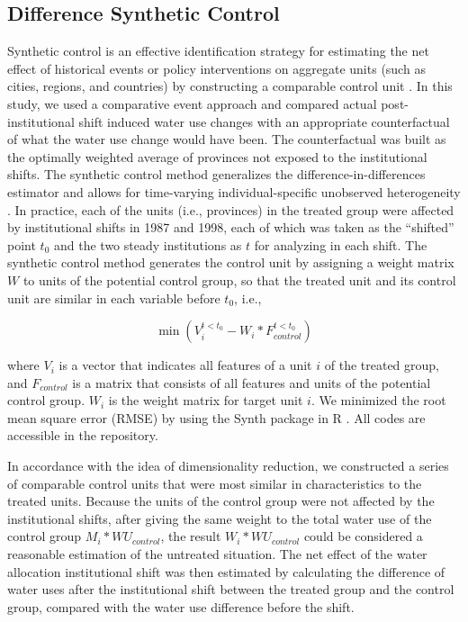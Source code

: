 \subsection{Difference Synthetic Control}
Synthetic control is an effective identification strategy for estimating the net effect of historical events or policy interventions on aggregate units (such as cities, regions, and countries) by constructing a comparable control unit \cite{abadie2010, abadie2015, hill2021}.
In this study, we used a comparative event approach and compared actual post-institutional shift induced water use changes with an appropriate counterfactual of what the water use change would have been.
The counterfactual was built as the optimally weighted average of provinces not exposed to the institutional shifts.
The synthetic control method generalizes the difference-in-differences estimator and allows for time-varying individual-specific unobserved heterogeneity \cite{billmeier2013, smith2015}.
In practice, each of the units (i.e., provinces) in the treated group were affected by institutional shifts in 1987 and 1998, each of which was taken as the “shifted” point $t_0$ and the two steady institutions as $t$ for analyzing in each shift. The synthetic control method generates the control unit by assigning a weight matrix $W$ to units of the potential control group, so that the treated unit and its control unit are similar in each variable before $t_0$, i.e.,

$$\min(V_{i}^{t<t_0} - W_i * F_{control}^{t<t_0})$$

where $V_i$ is a vector that indicates all features of a unit $i$ of the treated group, and $F_{control}$ is a matrix that consists of all features and units of the potential control group. $W_i$ is the weight matrix for target unit $i$. We minimized the root mean square error (RMSE) by using the Synth package in R \cite{abadieSynthPackageSynthetic2011, abadieComparativePoliticsSynthetic2015}. All codes are accessible in the repository.

In accordance with the idea of dimensionality reduction, we constructed a series of comparable control units that were most similar in characteristics to the treated units. Because the units of the control group were not affected by the institutional shifts, after giving the same weight to the total water use of the control group $M_i * WU_{control}$, the result $W_i*WU_{control}$ could be considered a reasonable estimation of the untreated situation. The net effect of the water allocation institutional shift was then estimated by calculating the difference of water uses after the institutional shift between the treated group and the control group, compared with the water use difference before the shift.

